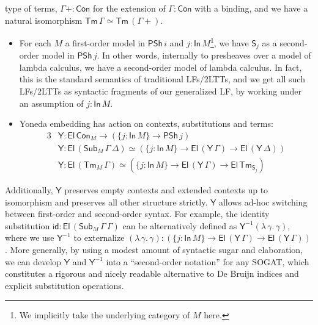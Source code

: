 \documentclass{easychair}
\newcommand{\msf}[1]{{\mathsf{#1}}}
\newcommand{\PSh}{\msf{PSh}}
\newcommand{\El}{\msf{El}}
\newcommand{\In}{\msf{In}}
\newcommand{\Tm}{\msf{Tm}}
\newcommand{\Con}{\msf{Con}}
\newcommand{\Sub}{\msf{Sub}}
\newcommand{\Y}{\msf{Y}}
\renewcommand{\S}{\msf{S}}
\begin{document}
type of terms, $\Gamma+ : \Con$ for the extension of $\Gamma : \Con$ with a
binding, and we have a natural isomorphism $\Tm\,\Gamma \simeq \Tm\,(\Gamma+)$.
\begin{itemize}
\item For each $M$ a first-order model in $\PSh\,i$ and $j : \In\,M$\footnote{We
implicitly take the underlying category of $M$ here.}, we have $\msf{S}_j$ as a
  second-order model in $\PSh\,j$. In other words, internally to presheaves over
  a model of lambda calculus, we have a second-order model of lambda
  calculus. In fact, this is the standard semantics of traditional LFs/2LTTs,
  and we get all such LFs/2LTTs as syntactic fragments of our generalized LF, by
  working under an assumption of $j : \In\,M$.
\item Yoneda embedding has action on contexts, substitutions and terms:
  \begin{alignat*}{3}
    & \Y : \El\,\Con_M \to (\{j : \In\,M\} \to \PSh\,j)\\
    & \Y : \El\,(\Sub_M\,\Gamma\,\Delta) \simeq (\{j : \In\,M\} \to \El\,(\Y\,\Gamma) \to \El\,(\Y\,\Delta))\\
    & \Y : \El\,(\Tm_M\,\Gamma) \simeq (\{j : \In\,M\} \to \El\,(\Y\,\Gamma) \to \El\,\Tm_{\S_j})
  \end{alignat*}
\end{itemize}
Additionally, $\Y$ preserves empty contexts and extended contexts up to
isomorphism and preserves all other structure strictly. $\Y$ allows ad-hoc
switching between first-order and second-order syntax. For example, the identity
substitution $\msf{id} : \El\,(\Sub_M\,\Gamma\,\Gamma)$ can be alternatively defined as
$\Y^{-1}(\lambda\,\gamma.\,\gamma)$, where we use $\Y^{-1}$ to externalize
$(\lambda\,\gamma.\,\gamma) : (\{j : \In\,M\} \to \El\,(\Y\,\Gamma) \to
\El\,(\Y\,\Gamma))$. More generally, by using a modest amount of syntactic sugar
and elaboration, we can develop $\Y$ and $\Y^{-1}$ into a ``second-order
notation'' for any SOGAT, which constitutes a rigorous and nicely readable
alternative to De Bruijn indices and explicit substitution operations.
\\
\end{document}
